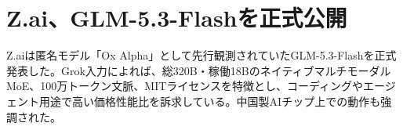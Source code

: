 \section{Z.ai、GLM-5.3-Flashを正式公開}
Z.aiは匿名モデル「Ox Alpha」として先行観測されていたGLM-5.3-Flashを正式発表した。Grok入力によれば、総320B・稼働18BのネイティブマルチモーダルMoE、100万トークン文脈、MITライセンスを特徴とし、コーディングやエージェント用途で高い価格性能比を訴求している。中国製AIチップ上での動作も強調された。
